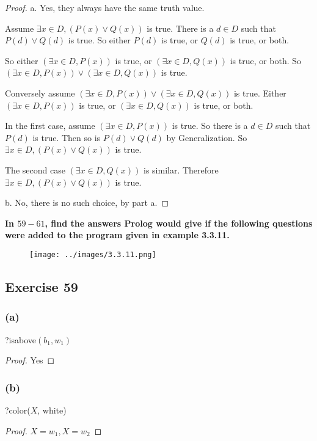 \documentclass[14pt]{extarticle}
\newcommand{\te}{\exists}
\begin{document}
\begin{proof}
    a. Yes, they always have the same truth value.

    Assume $\te x \in D, (P(x) \vee Q(x))$ is true. There is a $d \in D$ such that $P(d) \vee Q(d)$ is true. So either $P(d)$ is true, or $Q(d)$ is true, or both.

    So either $(\te x \in D, P(x))$ is true, or $(\te x \in D, Q(x))$ is true, or both. So $(\te x \in D, P(x)) \vee (\te x \in D, Q(x))$ is true.

    Conversely assume $(\te x \in D, P(x)) \vee (\te x \in D, Q(x))$ is true. Either $(\te x \in D, P(x))$ is true, or $(\te x \in D, Q(x))$ is true, or both.

    In the first case, assume $(\te x \in D, P(x))$ is true. So there is a $d \in D$ such that $P(d)$ is true. Then so is $P(d) \vee Q(d)$ by Generalization. So $\te x \in D, (P(x) \vee Q(x))$ is true.

    The second case $(\te x \in D, Q(x))$ is similar. Therefore $\te x \in D, (P(x) \vee Q(x))$ is true.

    b. No, there is no such choice, by part a.
\end{proof}

{\bf \color{cyan} In $59-61$, find the answers Prolog would give if the following questions were added to the program given in example 3.3.11.}

\begin{figure}[ht!]
    \centering
    \texttt{[image: ../images/3.3.11.png]}
\end{figure}

\subsection{Exercise 59}

\subsubsection{(a)}
?isabove$(b_1, w_1)$

\begin{proof}
    Yes
\end{proof}

\subsubsection{(b)}
?color($X$, white)

\begin{proof}
    $X = w_1, X = w_2$
\end{proof}
\end{document}
